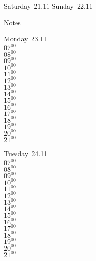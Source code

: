 \documentclass[11pt,a4paper]{book}\usepackage[]{graphicx}\usepackage[]{color}
\begin{document}
\begin{weekendbox}
  Saturday~21.11
  \tcblower
  Sunday~22.11
\end{weekendbox} %
\begin{notebox}
  Notes
\end{notebox}
\clearpage
\begin{headerbox}
\end{headerbox}
\begin{weekdaybox}
  Monday~23.11\\
  { 
  \vfill
  $07^{00}$\\
$08^{00}$\\
$09^{00}$\\
$10^{00}$\\
$11^{00}$\\
$12^{00}$\\
$13^{00}$\\
$14^{00}$\\
$15^{00}$\\
$16^{00}$\\
$17^{00}$\\
$18^{00}$\\
$19^{00}$\\
$20^{00}$\\
$21^{00}$\\
  }
\end{weekdaybox}
\begin{weekdaybox}
  Tuesday~24.11\\
  { 
  \vfill
  $07^{00}$\\
$08^{00}$\\
$09^{00}$\\
$10^{00}$\\
$11^{00}$\\
$12^{00}$\\
$13^{00}$\\
$14^{00}$\\
$15^{00}$\\
$16^{00}$\\
$17^{00}$\\
$18^{00}$\\
$19^{00}$\\
$20^{00}$\\
$21^{00}$\\
  }
\end{weekdaybox}
\end{document}
